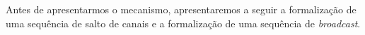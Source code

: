 

Antes de apresentarmos o mecanismo, apresentaremos a seguir a formalização de uma sequência de salto de canais e a formalização de uma sequência de {\it broadcast}. %





